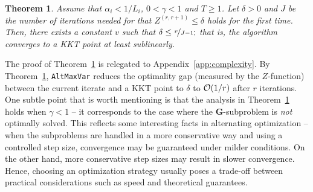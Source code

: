 \documentclass[10pt,journal]{IEEEtran}
\newtheorem{Theorem}{Theorem}
\begin{document}
\begin{Theorem}\label{thm:complexity}
Assume that $\alpha_i<1/L_i$, $0<\gamma<1$ and $T\geq 1$.
Let $\delta> 0$ and $J$ be the number of iterations needed for that $Z^{(r,r+1)}\leq \delta$ holds for the first time.
Then, there exists a constant $v$ such that
$\delta \leq \nicefrac{v}{J-1};$
that is, the algorithm converges to a KKT point at least sublinearly.
\end{Theorem}
The proof of Theorem~\ref{thm:complexity} is relegated to Appendix~\ref{app:complexity}.
By Theorem~\ref{thm:complexity}, \texttt{AltMaxVar} reduces the optimality gap (measured by the $Z$-function) between the current iterate and a KKT point to $\delta$ to ${\cal O}(1/r)$ after $r$ iterations. 
One subtle point that is worth mentioning is that the analysis in Theorem~\ref{thm:complexity} holds when $\gamma<1$ -- it corresponds to the case where the ${\bm G}$-subproblem is \emph{not} optimally solved. This reflects some interesting facts in alternating optimization -- when the subproblems are handled in a more conservative way and using a controlled step size, convergence may be guaranteed under milder conditions.
On the other hand, more conservative step sizes may result in slower convergence. Hence, choosing an optimization strategy usually poses a trade-off between practical considerations such as speed and theoretical guarantees. 
\end{document}
